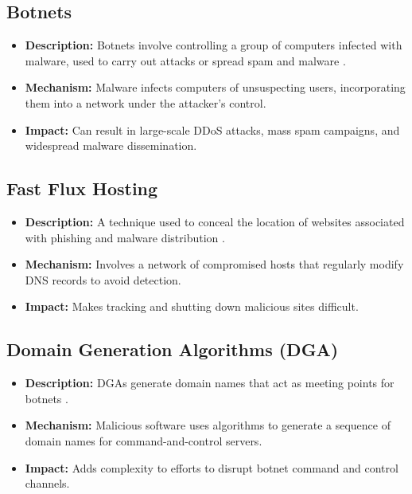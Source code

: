 \subsection{Botnets}
\begin{itemize}
    \item \textbf{Description:} Botnets involve controlling a group of computers infected with malware, used to carry out attacks or spread spam and malware \cite{citpyour}.
    \item \textbf{Mechanism:} Malware infects computers of unsuspecting users, incorporating them into a network under the attacker's control.
    \item \textbf{Impact:} Can result in large-scale DDoS attacks, mass spam campaigns, and widespread malware dissemination.
\end{itemize}

\subsection{Fast Flux Hosting}
\begin{itemize}
    \item \textbf{Description:} A technique used to conceal the location of websites associated with phishing and malware distribution \cite{lin2013genetic}.
    \item \textbf{Mechanism:} Involves a network of compromised hosts that regularly modify DNS records to avoid detection.
    \item \textbf{Impact:} Makes tracking and shutting down malicious sites difficult.
\end{itemize}

\subsection{Domain Generation Algorithms (DGA)}
\begin{itemize}
    \item \textbf{Description:} DGAs generate domain names that act as meeting points for botnets \cite{antonakakis2012throw}.
    \item \textbf{Mechanism:} Malicious software uses algorithms to generate a sequence of domain names for command-and-control servers.
    \item \textbf{Impact:} Adds complexity to efforts to disrupt botnet command and control channels.
\end{itemize}

    
